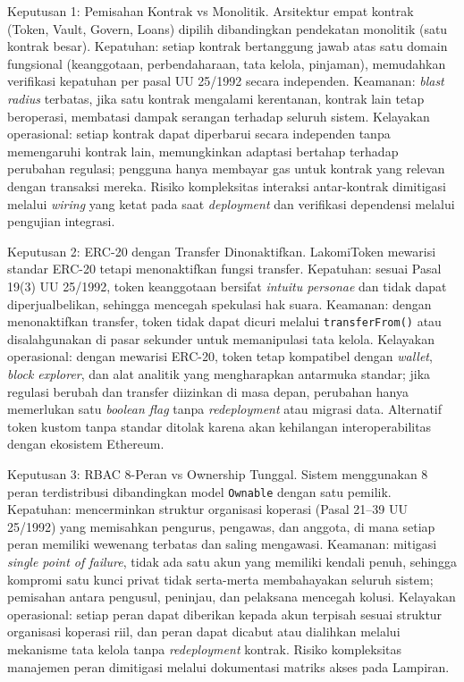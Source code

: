 Keputusan 1: Pemisahan Kontrak vs Monolitik. Arsitektur empat kontrak (Token, Vault, Govern, Loans) dipilih dibandingkan pendekatan monolitik (satu kontrak besar). Kepatuhan: setiap kontrak bertanggung jawab atas satu domain fungsional (keanggotaan, perbendaharaan, tata kelola, pinjaman), memudahkan verifikasi kepatuhan per pasal UU 25/1992 secara independen. Keamanan: \textit{blast radius} terbatas, jika satu kontrak mengalami kerentanan, kontrak lain tetap beroperasi, membatasi dampak serangan terhadap seluruh sistem. Kelayakan operasional: setiap kontrak dapat diperbarui secara independen tanpa memengaruhi kontrak lain, memungkinkan adaptasi bertahap terhadap perubahan regulasi; pengguna hanya membayar gas untuk kontrak yang relevan dengan transaksi mereka. Risiko kompleksitas interaksi antar-kontrak dimitigasi melalui \textit{wiring} yang ketat pada saat \textit{deployment} dan verifikasi dependensi melalui pengujian integrasi.

Keputusan 2: ERC-20 dengan Transfer Dinonaktifkan. LakomiToken mewarisi standar ERC-20 tetapi menonaktifkan fungsi transfer. Kepatuhan: sesuai Pasal 19(3) UU 25/1992, token keanggotaan bersifat \textit{intuitu personae} dan tidak dapat diperjualbelikan, sehingga mencegah spekulasi hak suara. Keamanan: dengan menonaktifkan transfer, token tidak dapat dicuri melalui \texttt{transferFrom()} atau disalahgunakan di pasar sekunder untuk memanipulasi tata kelola. Kelayakan operasional: dengan mewarisi ERC-20, token tetap kompatibel dengan \textit{wallet}, \textit{block explorer}, dan alat analitik yang mengharapkan antarmuka standar; jika regulasi berubah dan transfer diizinkan di masa depan, perubahan hanya memerlukan satu \textit{boolean flag} tanpa \textit{redeployment} atau migrasi data. Alternatif token kustom tanpa standar ditolak karena akan kehilangan interoperabilitas dengan ekosistem Ethereum.

Keputusan 3: RBAC 8-Peran vs Ownership Tunggal. Sistem menggunakan 8 peran terdistribusi dibandingkan model \texttt{Ownable} dengan satu pemilik. Kepatuhan: mencerminkan struktur organisasi koperasi (Pasal 21--39 UU 25/1992) yang memisahkan pengurus, pengawas, dan anggota, di mana setiap peran memiliki wewenang terbatas dan saling mengawasi. Keamanan: mitigasi \textit{single point of failure}, tidak ada satu akun yang memiliki kendali penuh, sehingga kompromi satu kunci privat tidak serta-merta membahayakan seluruh sistem; pemisahan antara pengusul, peninjau, dan pelaksana mencegah kolusi. Kelayakan operasional: setiap peran dapat diberikan kepada akun terpisah sesuai struktur organisasi koperasi riil, dan peran dapat dicabut atau dialihkan melalui mekanisme tata kelola tanpa \textit{redeployment} kontrak. Risiko kompleksitas manajemen peran dimitigasi melalui dokumentasi matriks akses pada Lampiran.

